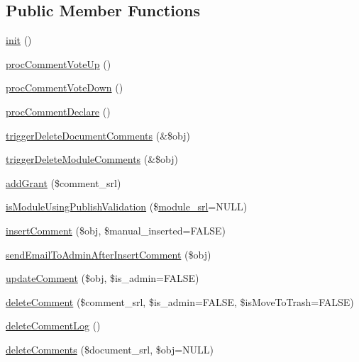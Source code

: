 \subsection*{Public Member Functions}
\begin{DoxyCompactItemize}
\item 
\hyperlink{classcommentController_aee7912001fe1896ca5440d22b42c626d}{init} ()
\item 
\hyperlink{classcommentController_a1ca216be683b8cedf6b5f71aaa23a0b3}{proc\+Comment\+Vote\+Up} ()
\item 
\hyperlink{classcommentController_ae5c2ce138a0c36f2d7fb4f1fdcfad800}{proc\+Comment\+Vote\+Down} ()
\item 
\hyperlink{classcommentController_af2d31904b424b330a3f2710c16d55f7b}{proc\+Comment\+Declare} ()
\item 
\hyperlink{classcommentController_ab209ef386bfb83c88a85bf4618237aca}{trigger\+Delete\+Document\+Comments} (\&\$obj)
\item 
\hyperlink{classcommentController_a8c9ad7337a8522f82a4010f9f0afa274}{trigger\+Delete\+Module\+Comments} (\&\$obj)
\item 
\hyperlink{classcommentController_a429acbf0d176d50256f666ecf9364aa8}{add\+Grant} (\$comment\+\_\+srl)
\item 
\hyperlink{classcommentController_ad77fc43c9ea8beb6397d541f8ff44f93}{is\+Module\+Using\+Publish\+Validation} (\$\hyperlink{ko_8install_8php_a370bb6450fab1da3e0ed9f484a38b761}{module\+\_\+srl}=N\+U\+L\+L)
\item 
\hyperlink{classcommentController_adf4259b95832275119add098174c8816}{insert\+Comment} (\$obj, \$manual\+\_\+inserted=F\+A\+L\+S\+E)
\item 
\hyperlink{classcommentController_a36736562b092a021301ec11a61310e68}{send\+Email\+To\+Admin\+After\+Insert\+Comment} (\$obj)
\item 
\hyperlink{classcommentController_aa2a123794691f3e5153f4df0b03c318f}{update\+Comment} (\$obj, \$is\+\_\+admin=F\+A\+L\+S\+E)
\item 
\hyperlink{classcommentController_adfd7bfdb249d109119f85e72aca2253c}{delete\+Comment} (\$comment\+\_\+srl, \$is\+\_\+admin=F\+A\+L\+S\+E, \$is\+Move\+To\+Trash=F\+A\+L\+S\+E)
\item 
\hyperlink{classcommentController_a74209017d102354e16394a3d0bb97fda}{delete\+Comment\+Log} ()
\item 
\hyperlink{classcommentController_a40b5ccce875c41ce902c82ec622c938e}{delete\+Comments} (\$document\+\_\+srl, \$obj=N\+U\+L\+L)

\end{DoxyCompactItemize}
